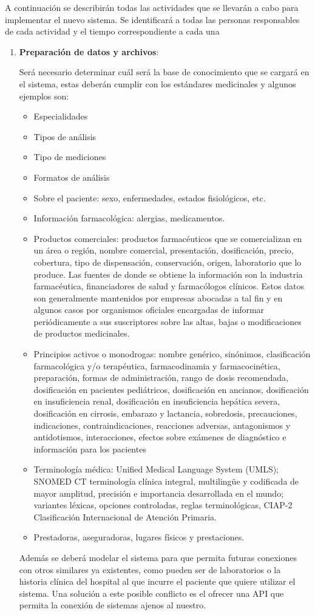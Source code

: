 A continuación se describirán todas las actividades que se llevarán a cabo para implementar el nuevo sistema. Se identificará a todas las personas responsables de cada actividad  y el tiempo correspondiente a cada una
\begin{enumerate}
\item \textbf{Preparación de datos y archivos}:

Será necesario determinar cuál será la base de conocimiento que se cargará en el sistema, estas deberán cumplir con los estándares medicinales y algunos ejemplos son:
\begin{itemize}
\item Especialidades
\item Tipos de  análisis
\item Tipo de mediciones 
\item Formatos de análisis
\item Sobre el paciente: sexo, enfermedades, estados fisiológicos, etc.
\item Información farmacológica: alergias, medicamentos.
\item Productos comerciales: productos farmacéuticos que se comercializan en un área o región, nombre comercial, presentación, dosificación, precio, cobertura, tipo de dispensación, conservación, origen, laboratorio que lo produce. Las fuentes de donde se obtiene la información son la industria farmacéutica, financiadores de salud y farmacólogos clínicos. Estos datos son generalmente mantenidos por empresas abocadas a tal fin y en algunos casos por organismos oficiales encargadas de informar periódicamente a sus suscriptores sobre las altas, bajas o modificaciones de productos medicinales.
\item Principios activos o monodrogas: nombre genérico, sinónimos, clasificación farmacológica y/o terapéutica, farmacodinamia y farmacocinética, preparación, formas de administración, rango de dosis recomendada, dosificación en pacientes pediátricos, dosificación en ancianos, dosificación en insuficiencia renal, dosificación en insuficiencia hepática severa, dosificación en cirrosis, embarazo y lactancia, sobredosis, precauciones, indicaciones, contraindicaciones, reacciones adversas, antagonismos y antidotismos, interacciones, efectos sobre exámenes de diagnóstico e información para los pacientes
\item Terminología médica: Unified Medical Language System (UMLS); SNOMED CT  terminología clínica integral, multilingüe y codificada de mayor amplitud, precisión e importancia desarrollada en el mundo; variantes léxicas, opciones controladas, reglas terminológicas, CIAP-2 Clasificación Internacional de Atención Primaria.
\item Prestadoras, aseguradoras, lugares físicos y prestaciones.
\end{itemize} 
Además se deberá modelar el sistema para que permita futuras conexiones con otros similares ya existentes, como pueden ser de laboratorios o la historia clínica del hospital al que incurre el paciente que quiere utilizar el sistema. Una solución a este posible conflicto es el ofrecer una API que permita la conexión de sistemas ajenos al nuestro.


\end{enumerate}
